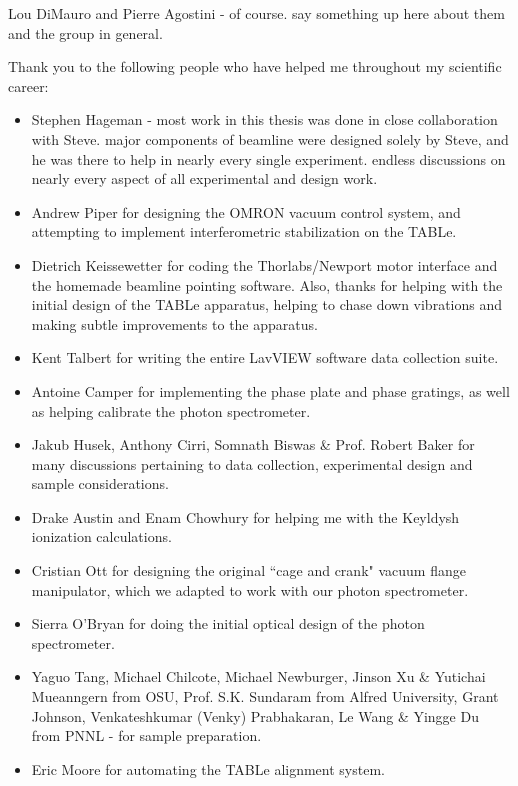 \begin{acknowledgments}

Lou DiMauro and Pierre Agostini - of course. say something up here about them and the group in general.

Thank you to the following people who have helped me throughout my scientific career:

\begin{itemize}
	\item Stephen Hageman - most work in this thesis was done in close collaboration with Steve. major components of beamline were designed solely by Steve, and he was there to help in nearly every single experiment. endless discussions on nearly every aspect of all experimental and design work.
	\item Andrew Piper for designing the OMRON vacuum control system, and attempting to implement interferometric stabilization on the TABLe.
	\item Dietrich Keissewetter for coding the Thorlabs/Newport motor interface and the homemade beamline pointing software. Also, thanks for helping with the initial design of the TABLe apparatus, helping to chase down vibrations and making subtle improvements to the apparatus.
	\item Kent Talbert for writing the entire LavVIEW software data collection suite.
	\item Antoine Camper for implementing the phase plate and phase gratings, as well as helping calibrate the photon spectrometer.
	\item Jakub Husek, Anthony Cirri, Somnath Biswas \& Prof. Robert Baker for many discussions pertaining to data collection, experimental design and sample considerations.
	\item Drake Austin and Enam Chowhury for helping me with the Keyldysh ionization calculations.
	\item Cristian Ott for designing the original ``cage and crank" vacuum flange manipulator, which we adapted to work with our photon spectrometer.
	\item Sierra O'Bryan for doing the initial optical design of the photon spectrometer.
	\item Yaguo Tang, Michael Chilcote, Michael Newburger, Jinson Xu \& Yutichai Mueanngern from OSU, Prof. S.K. Sundaram from Alfred University, Grant Johnson, Venkateshkumar (Venky) Prabhakaran, Le Wang \& Yingge Du from PNNL - for sample preparation.
	\item Eric Moore for automating the TABLe alignment system.

\end{itemize}
\end{acknowledgments}
